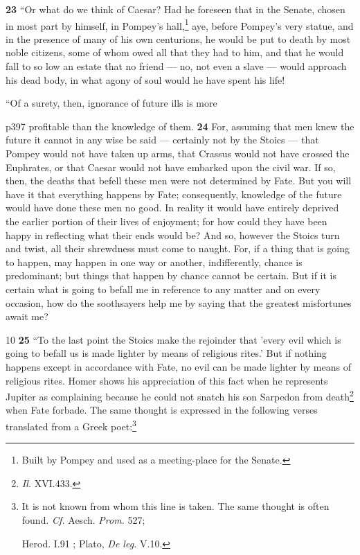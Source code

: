 \textbf{23} ``Or what do we think of Caesar? Had he foreseen that in the Senate, chosen in most part by himself, in Pompey's hall,\texthebrew{}\footnote{Built by Pompey and used as a meeting-place for the Senate.

} aye, before Pompey's very statue, and in the presence of many of his own centurions, he would be put to death by most noble citizens, some of whom owed all that they had to him, and that he would fall to so low an estate that no friend \texthebrew{—} no, not even a slave \texthebrew{—} would approach his dead body, in what agony of soul would he have spent his life!

``Of a surety, then, ignorance of future ills is more

p397 profitable than the knowledge of them. \textbf{24} For, assuming that men knew the future it cannot in any wise be said \texthebrew{—} certainly not by the Stoics \texthebrew{—} that Pompey would not have taken up arms, that Crassus would not have crossed the Euphrates, or that Caesar would not have embarked upon the civil war. If so, then, the deaths that befell these men were not determined by Fate. But you will have it that everything happens by Fate; consequently, knowledge of the future would have done these men no good. In reality it would have entirely deprived the earlier portion of their lives of enjoyment; for how could they have been happy in reflecting what their ends would be? And so, however the Stoics turn and twist, all their shrewdness must come to naught. For, if a thing that is going to happen, may happen in one way or another, indifferently, chance is predominant; but things that happen by chance cannot be certain. But if it is certain what is going to befall me in reference to any matter and on every occasion, how do the soothsayers help me by saying that the greatest misfortunes await me?

10
\textbf{25} ``To the last point the Stoics make the rejoinder that 'every evil which is going to befall us is made lighter by means of religious rites.' But if nothing happens except in accordance with Fate, no evil can be made lighter by means of religious rites. Homer shows his appreciation of this fact when he represents Jupiter as complaining because he could not snatch his son Sarpedon from death\texthebrew{}\footnote{\emph{Il.} XVI.433.

} when Fate forbade. The same thought is expressed in the following verses translated from a Greek poet:\footnote{It is not known from whom this line is taken. The same thought is often found. \emph{Cf.} Aesch. \emph{Prom.} 527;

Herod. I.91 ; Plato, \emph{De leg.} V.10.

}

